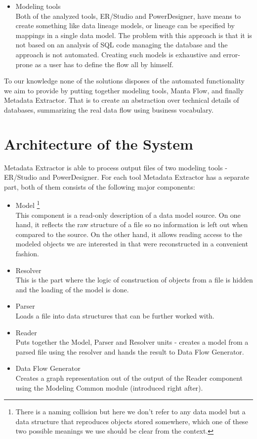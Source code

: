 \begin{itemize}
	\item Modeling tools \\
	Both of the analyzed tools, ER/Studio and PowerDesigner, have means to create something like data lineage models, or lineage can be specified by mappings in a single data model. The problem with this approach is that it is not based on an analysis of SQL code managing the database and the approach is not automated. Creating such models is exhaustive and error-prone as a user has to define the flow all by himself. 
\end{itemize}


To our knowledge none of the solutions disposes of the automated functionality we aim to provide by putting together modeling tools, Manta Flow, and finally Metadata Extractor. That is to create an abstraction over technical details of databases, summarizing the real data flow using business vocabulary.

\section{Architecture of the System}

Metadata Extractor is able to process output files of two modeling tools - ER/Studio and PowerDesigner. For each tool Metadata Extractor has a separate part, both of them consists of the following major components:
\begin{itemize}
	\item Model \footnote{There is a naming collision but here we don't refer to any data model but a data structure that reproduces objects stored somewhere, which one of these two possible meanings we use should be clear from the context.}\\ 
	This component is a read-only description of a data model source. On one hand, it reflects the raw structure of a file so no information is left out when compared to the source. 
	On the other hand, it allows reading access to the modeled objects we are interested in that were reconstructed in a convenient fashion.
	\item Resolver \\ 
	This is the part where the logic of construction of objects from a file is hidden and the loading of the model is done. 
	\item Parser \\ 
	Loads a file into data structures that can be further worked with.
	\item Reader \\
	Puts together the Model, Parser and Resolver units - creates a model from a parsed file using the resolver and hands the result to Data Flow Generator.
	\item Data Flow Generator \\ 
	Creates a graph representation out of the output of the Reader component using the Modeling Common module (introduced right after).
\end{itemize}

